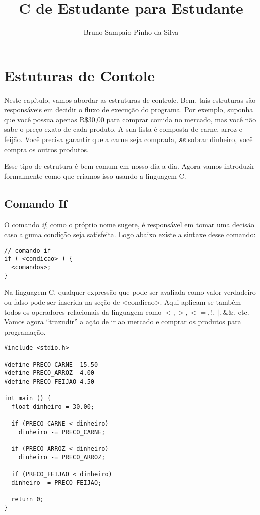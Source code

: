 \documentclass[12pt,a4paper]{book}
\author{Bruno Sampaio Pinho da Silva}
\title{C de Estudante para Estudante}
\begin{document}
\maketitle
\tableofcontents

\chapter{Estuturas de Contole}
Neste capítulo, vamos abordar as estruturas de controle. Bem, tais estruturas são responsáveis em decidir o fluxo de execução do programa. Por exemplo, suponha que você possua apenas R\$30,00 para comprar comida no mercado, mas você não sabe o preço exato de cada produto. A sua lista é composta de carne, arroz e feijão. Você precisa garantir que a carne seja comprada, \emph{\textbf{se}} sobrar dinheiro, você compra os outros produtos.

Esse tipo de estrutura é bem comum em nosso dia a dia. Agora vamos introduzir formalmente como que criamos isso usando a linguagem C.

\section{Comando If}
O comando \textit{if}, como o próprio nome sugere, é responsável em tomar uma decisão caso alguma condição seja satisfeita. Logo abaixo existe a sintaxe desse comando:


\begin{lstlisting}[label=comandoIf,caption=Comando if]
// comando if
if ( <condicao> ) {
  <comandos>;
}
\end{lstlisting}

Na linguagem C, qualquer expressão que pode ser avaliada como valor verdadeiro ou falso pode ser inserida na seção de <condicao>. Aqui aplicam-se também todos os operadores relacionais da linguagem como $<, >, <=, !, ||,  \&\&$, etc.
Vamos agora ``trazudir'' a ação de ir ao mercado e comprar os produtos para programação.


\begin{lstlisting}[label=comandoIf,caption=Comando if]
#include <stdio.h>

#define PRECO_CARNE  15.50
#define PRECO_ARROZ  4.00
#define PRECO_FEIJAO 4.50

int main () {
  float dinheiro = 30.00;
  
  if (PRECO_CARNE < dinheiro)
    dinheiro -= PRECO_CARNE;
  
  if (PRECO_ARROZ < dinheiro)
    dinheiro -= PRECO_ARROZ;
  
  if (PRECO_FEIJAO < dinheiro)
  dinheiro -= PRECO_FEIJAO;    
  
  return 0;
}
\end{lstlisting}
\end{document}
